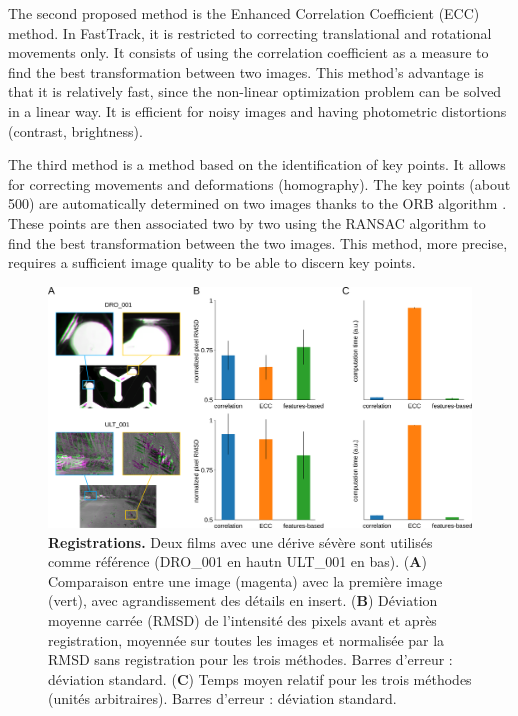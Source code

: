 		The second proposed method is the Enhanced Correlation Coefficient (ECC) method. In FastTrack, it is restricted to correcting translational and rotational movements only. It consists of using the correlation coefficient as a measure to find the best transformation between two images. This method's advantage is that it is relatively fast, since the non-linear optimization problem can be solved in a linear way. It is efficient for noisy images and having photometric distortions (contrast, brightness).


		The third method is a method based on the identification of key points. It allows for correcting movements and deformations (homography). The key points (about 500) are automatically determined on two images thanks to the ORB algorithm \cite{}. These points are then associated two by two using the RANSAC algorithm \cite{} to find the best transformation between the two images. This method, more precise, requires a sufficient image quality to be able to discern key points.
		
	\begin{figure}[h!]
    \centering
    \includegraphics[width=1\textwidth]{part_1/assets/Figure_2.png}    
    \caption{\textbf{Registrations.} Deux films avec une dérive sévère sont utilisés comme référence (DRO\_001 en hautn ULT\_001 en bas). (\textbf{A}) Comparaison entre une image (magenta) avec la première image (vert), avec agrandissement des détails en insert. (\textbf{B}) Déviation moyenne carrée (RMSD) de l'intensité des pixels avant et après registration, moyennée sur toutes les images et normalisée par la RMSD sans registration pour les trois méthodes. Barres d'erreur : déviation standard. (\textbf{C}) Temps moyen relatif pour les trois méthodes (unités arbitraires). Barres d'erreur : déviation standard.}
    \label{part_1:fig_2}
    \end{figure}
		
